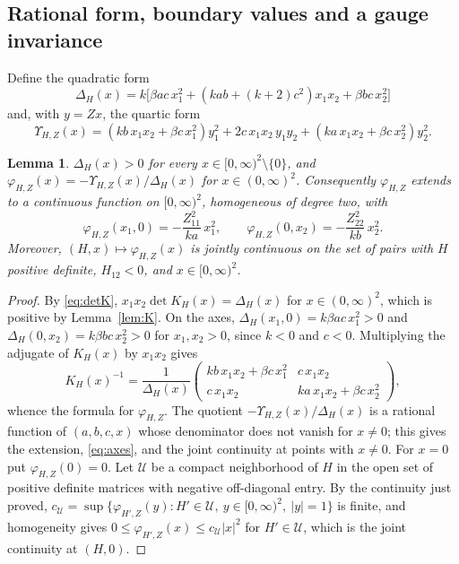 \documentclass[11pt]{amsart}
\newtheorem{lemma}[theorem]{Lemma}
\theoremstyle{definition}
\theoremstyle{remark}
\numberwithin{equation}{section}
\begin{document}
\subsection{Rational form, boundary values and a gauge invariance}
Define the quadratic form
\begin{equation}\label{eq:Delta}
\Delta_H(x)=k\bigl[\beta ac\,x_1^2+(kab+(k+2)c^2)x_1x_2+\beta bc\,x_2^2\bigr]
\end{equation}
and, with $y=Zx$, the quartic form
\begin{equation}\label{eq:Upsilon}
\Upsilon_{H,Z}(x)=(kb\,x_1x_2+\beta c\,x_1^2)y_1^2+2c\,x_1x_2\,y_1y_2+(ka\,x_1x_2+\beta c\,x_2^2)y_2^2 .
\end{equation}

\begin{lemma}\label{lem:rational}
$\Delta_H(x)>0$ for every $x\in[0,\infty)^2\setminus\{0\}$, and $\varphi_{H,Z}(x)=-\Upsilon_{H,Z}(x)/\Delta_H(x)$ for $x\in(0,\infty)^2$. Consequently $\varphi_{H,Z}$ extends to a continuous function on $[0,\infty)^2$, homogeneous of degree two, with
\begin{equation}\label{eq:axes}
\varphi_{H,Z}(x_1,0)=-\frac{Z_{11}^2}{ka}\,x_1^2,\qquad \varphi_{H,Z}(0,x_2)=-\frac{Z_{22}^2}{kb}\,x_2^2 .
\end{equation}
Moreover, $(H,x)\mapsto\varphi_{H,Z}(x)$ is jointly continuous on the set of pairs with $H$ positive definite, $H_{12}<0$, and $x\in[0,\infty)^2$.
\end{lemma}

\begin{proof}
By \eqref{eq:detK}, $x_1x_2\det K_H(x)=\Delta_H(x)$ for $x\in(0,\infty)^2$, which is positive by Lemma~\ref{lem:K}. On the axes, $\Delta_H(x_1,0)=k\beta ac\,x_1^2>0$ and $\Delta_H(0,x_2)=k\beta bc\,x_2^2>0$ for $x_1,x_2>0$, since $k<0$ and $c<0$. Multiplying the adjugate of $K_H(x)$ by $x_1x_2$ gives
\[
K_H(x)^{-1}=\frac1{\Delta_H(x)}\begin{pmatrix}kb\,x_1x_2+\beta c\,x_1^2&c\,x_1x_2\\ c\,x_1x_2&ka\,x_1x_2+\beta c\,x_2^2\end{pmatrix},
\]
whence the formula for $\varphi_{H,Z}$. The quotient $-\Upsilon_{H,Z}(x)/\Delta_H(x)$ is a rational function of $(a,b,c,x)$ whose denominator does not vanish for $x\ne0$; this gives the extension, \eqref{eq:axes}, and the joint continuity at points with $x\ne0$. For $x=0$ put $\varphi_{H,Z}(0)=0$. Let $\mathcal U$ be a compact neighborhood of $H$ in the open set of positive definite matrices with negative off-diagonal entry. By the continuity just proved, $c_{\mathcal U}=\sup\{\varphi_{H',Z}(y):H'\in\mathcal U,\ y\in[0,\infty)^2,\ |y|=1\}$ is finite, and homogeneity gives $0\le\varphi_{H',Z}(x)\le c_{\mathcal U}|x|^2$ for $H'\in\mathcal U$, which is the joint continuity at $(H,0)$.
\end{proof}
\end{document}
